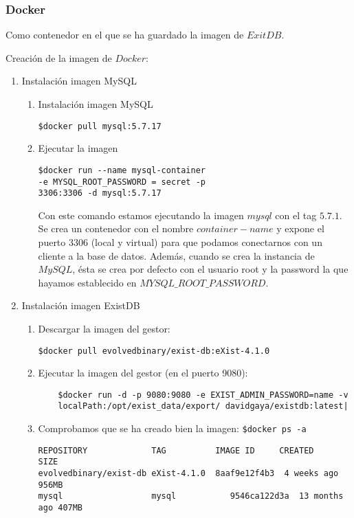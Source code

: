 \documentclass[12pt,a4paper]{article}
\begin{document}
\subsubsection{Docker} Como contenedor en el que se ha guardado la imagen de $ExitDB$. \label{pto411}

Creación de la imagen de $Docker:$
\begin{enumerate}
\item Instalación imagen MySQL
\begin{enumerate}[label*=\arabic*.]
\item Instalación imagen  MySQL

\verb|$docker pull mysql:5.7.17|

\item Ejecutar la imagen 
\begin{verbatim}
$docker run --name mysql-container 
-e MYSQL_ROOT_PASSWORD = secret -p 
3306:3306 -d mysql:5.7.17
\end{verbatim}
Con este comando estamos ejecutando la imagen $mysql$ con el tag $5.7.1$. Se crea un contenedor con el nombre $container-name$ y expone el puerto $3306$ (local y virtual) para que podamos conectarnos con un cliente a la base de datos. Además, cuando se crea la instancia de $MySQL$, ésta se crea por defecto con el usuario root y la password la que hayamos establecido en $MYSQL\_ROOT\_PASSWORD.$ 

\end{enumerate}
\item Instalación imagen  ExistDB
\begin{enumerate}[label*=\arabic*.]
\item Descargar la imagen del gestor:

	\verb|$docker pull evolvedbinary/exist-db:eXist-4.1.0|
\item Ejecutar la imagen del gestor (en el puerto 9080):
	\begin{verbatim}
	$docker run -d -p 9080:9080 -e EXIST_ADMIN_PASSWORD=name -v 
	localPath:/opt/exist_data/export/ davidgaya/existdb:latest|
	\end{verbatim}

\item Comprobamos que se ha creado bien la imagen:
	\verb|$docker ps -a|
	\begin{verbatim}
REPOSITORY             TAG          IMAGE ID     CREATED    SIZE
evolvedbinary/exist-db eXist-4.1.0  8aaf9e12f4b3  4 weeks ago 956MB
mysql                  mysql	       9546ca122d3a  13 months ago 407MB
	\end{verbatim}
\end{enumerate}


\end{enumerate}
\end{document}
